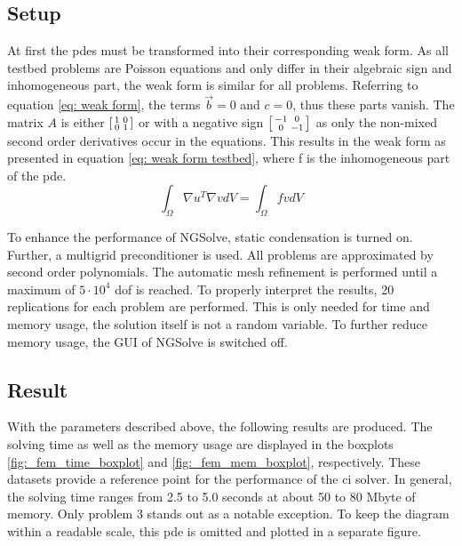 \documentclass[./\jobname.tex]{subfiles}
\begin{document}
\subsection{Setup}
At first the \gls{pde}s must be transformed into their corresponding weak form. As all testbed problems are Poisson equations and only differ in their algebraic sign and inhomogeneous part, the weak form is similar for all problems. Referring to equation \eqref{eq: weak form}, the terms $\vec{b} = 0$ and $c = 0$, thus these parts vanish. The matrix $A$ is either $\begin{bsmallmatrix} 1 & 0 \\ 0 & 1 \end{bsmallmatrix}$ or with a negative sign $\begin{bsmallmatrix} -1 & 0 \\ 0 & -1 \end{bsmallmatrix}$ as only the non-mixed second order derivatives occur in the equations. This results in the weak form as presented in equation \eqref{eq: weak form testbed}, where f is the inhomogeneous part of the \gls{pde}.
\begin{equation}
\label{eq: weak form testbed}
\int_{\Omega} \nabla u^T \nabla v dV = \int_{\Omega} f v dV
\end{equation}

To enhance the performance of NGSolve, static condensation is turned on. Further, a multigrid preconditioner is used. All problems are approximated by second order polynomials. The automatic mesh refinement is performed until a maximum of $5 \cdot 10^4$ \gls{dof} is reached. To properly interpret the results, 20 replications for each problem are performed. This is only needed for time and memory usage, the solution itself is not a random variable. To further reduce memory usage, the GUI of NGSolve is switched off. 

\subsection{Result}
With the parameters described above, the following results are produced. The solving time as well as the memory usage are displayed in the boxplots \ref{fig:_fem_time_boxplot} and \ref{fig:_fem_mem_boxplot}, respectively. These datasets provide a reference point for the performance of the \gls{ci} solver. In general, the solving time ranges from 2.5 to 5.0 seconds at about 50 to 80 Mbyte of memory. Only problem 3 stands out as a notable exception. To keep the diagram within a readable scale, this \gls{pde} is omitted and plotted in a separate figure. 
\end{document}
